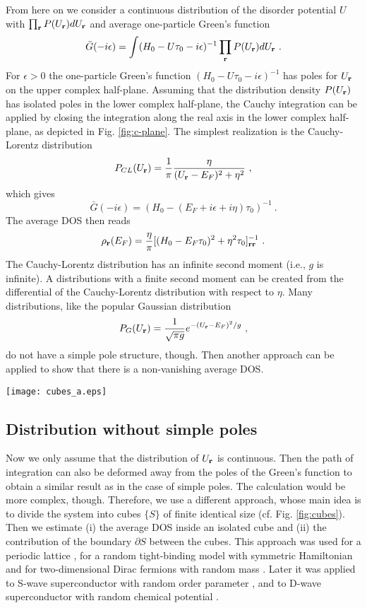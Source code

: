 \documentclass[aps]{revtex4}
\def\beq{\begin{equation}}
\def\eeq{\end{equation}}
\def\br{{\bf r}}
\begin{document}
From here on we consider a continuous distribution of the disorder potential $U$ with
$\prod_\br P(U_\br)dU_\br$ and average one-particle Green's function
\beq
{\bar G}(-i\epsilon)=\int (H_0-U\tau_0-i\epsilon)^{-1}\prod_\br P(U_\br)d U_\br
\ .
\eeq
For $\epsilon>0$ the one-particle Green's function $(H_0-U\tau_0-i\epsilon)^{-1}$ has poles 
for $U_\br$ on the upper complex half-plane.
Assuming that the distribution density $P(U_\br)$ has isolated poles in the lower complex half-plane,
the Cauchy integration can be applied by closing the integration along the real axis in the
lower complex half-plane,
as depicted in Fig. \ref{fig:c-plane}. The simplest realization is the Cauchy-Lorentz distribution
\beq
P_{CL}(U_\br)=\frac{1}{\pi}\frac{\eta}{(U_\br-E_F)^2+\eta^2}
\ ,
\eeq
which gives
\beq
{\bar G}(-i\epsilon)
=(H_0-(E_F+i\epsilon+i\eta)\tau_0)^{-1}
\ .
\eeq
The average DOS then reads
\beq
\rho_{\br}(E_F)=\frac{\eta}{\pi}
[(H_0-E_F\tau_0)^2+\eta^2\tau_0]^{-1}_{\br\br}
\ .
\eeq
The Cauchy-Lorentz distribution has an infinite second moment (i.e., $g$ is infinite). 
A distributions with a finite second moment can be created from the differential of the Cauchy-Lorentz
distribution with respect to $\eta$. 
Many distributions, like the popular Gaussian distribution
\beq
P_G(U_\br)=\frac{1}{\sqrt{\pi g}}e^{-(U_\br-E_F)^2/g}
\ ,
\eeq
do not have a simple pole structure, though. Then another approach can be applied to show that 
there is a non-vanishing average DOS.

\begin{figure*}[t]
\texttt{[image: cubes\_a.eps]}
\caption{
Dividing the system into cubes $\{ S\}$ of size $|S|$ with boundary $\partial S$.
}
\label{fig:cubes}
\end{figure*}


\subsection{Distribution without simple poles}
\label{sect:lower_bound}

Now we only assume that the distribution of $U_\br$ is continuous. Then the path
of integration can also be deformed away from the poles of the Green's function
to obtain a similar result as in the case of simple poles. The calculation would be 
more complex, though. Therefore, we use a different approach, whose main idea is to
divide the system into cubes $\{ S\}$ of finite identical size (cf. Fig. \ref{fig:cubes}).
Then we estimate (i) the average DOS inside an isolated cube and (ii) the 
contribution of the boundary $\partial S$ between the cubes. This approach was used for a periodic
lattice \cite{ledermann44}, for a random tight-binding model with symmetric Hamiltonian \cite{wegner81}
and for two-dimensional Dirac fermions with random mass \cite{ziegler87}. Later it was applied to 
S-wave superconductor with random order parameter \cite{ziegler88}, and to D-wave superconductor with 
random chemical potential \cite{ziegler98}.
\end{document}
